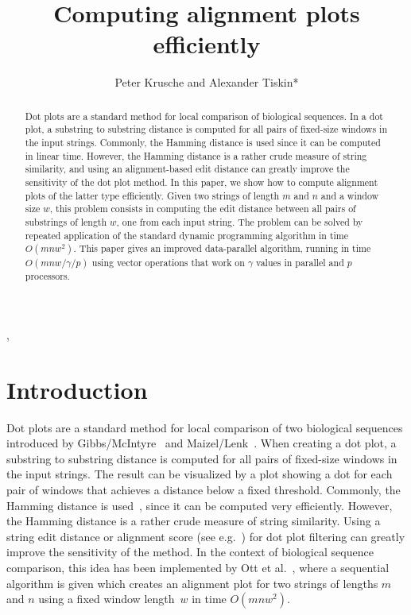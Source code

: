 \documentclass{IOS-Book-Article}     \usepackage{amsmath}
\theoremstyle{plain}
\theoremstyle{definition}
\begin{document}
\begin{frontmatter}          \title{Computing alignment plots efficiently}


\author{Peter Krusche and Alexander Tiskin*},
\address{Dept. of Computer Science, University of Warwick, Coventry,
CV4~7AL, UK}
\begin{abstract}
Dot plots are a standard method for local comparison of biological
sequences. In a dot plot, a substring to substring distance is computed for all
pairs of fixed-size windows in the input strings. Commonly, the Hamming distance
is used since it can be computed in linear time. However, the Hamming distance
is a rather crude measure of string similarity, and using an alignment-based edit
distance can greatly improve the sensitivity of the dot plot method.
In this paper, we show how to compute alignment plots of the latter type
efficiently. Given two strings of length $m$ and $n$ and a window size $w$, this
problem consists in computing the edit distance between all pairs of
substrings of length $w$, one from each input string. The problem can be
solved by repeated application of the standard dynamic programming
algorithm in time $O(mnw^2)$. This paper gives an improved
data-parallel algorithm, running in time $O(mnw/\gamma/p)$ using vector
operations that work on $\gamma$ values in parallel and $p$ processors.
\end{abstract}



\end{frontmatter}



\section{Introduction}

\let\thefootnote\relax{}
Dot plots are a standard method for local comparison of two biological
sequences introduced by Gibbs/McIntyre~\cite{Gibbs:70} and
Maizel/Lenk~\cite{Maizel_Lenk:81}.
When creating a dot plot, a substring to substring distance is computed
for all pairs of fixed-size windows in the input strings. The result
can be visualized by a plot showing a dot for each pair of windows that
achieves a distance below a fixed threshold.
Commonly, the Hamming distance is used~\cite{Maizel_Lenk:81,Krumsiek:07}, since it can be
computed very efficiently. 
However, the Hamming distance is a rather crude measure of string similarity.
Using a string edit distance or alignment score (see e.g.\ \cite{Gusfield:97})
for dot plot filtering can greatly improve the sensitivity of the method.
In the context of biological sequence comparison, this idea has been implemented
by Ott et al.~\cite{Ott:09}, where a sequential algorithm is given which
creates an alignment plot for two strings of lengths $m$ and $n$ using a 
fixed window length~$w$ in time $O(m n w^2)$. 
\end{document}
